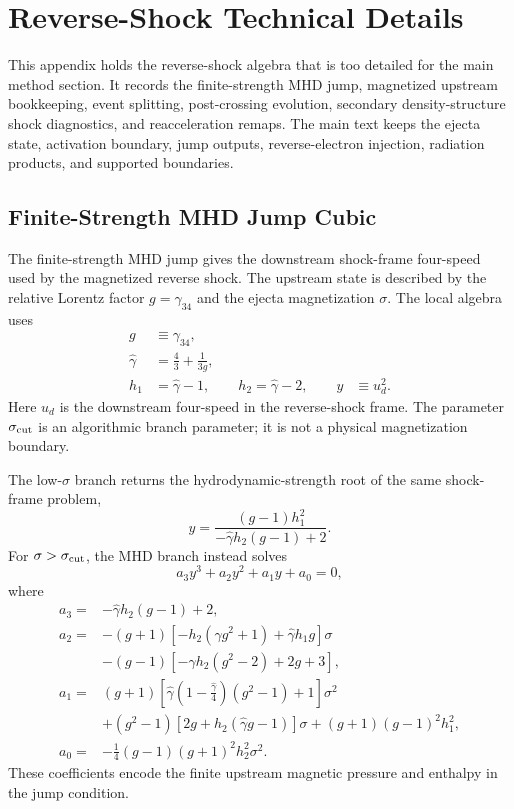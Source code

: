 \documentclass[twocolumn]{aastex702}
\begin{document}
\section{Reverse-Shock Technical Details} \label{app:reverse-shock-technical}

This appendix holds the reverse-shock algebra that is too detailed for the main
method section.  It records the finite-strength MHD jump, magnetized upstream
bookkeeping, event splitting, post-crossing evolution, secondary density-structure
shock diagnostics, and reacceleration remaps.  The main text keeps the ejecta
state, activation boundary, jump outputs, reverse-electron injection, radiation
products, and supported boundaries.

\subsection{Finite-Strength MHD Jump Cubic}

The finite-strength MHD jump gives the downstream shock-frame four-speed used by
the magnetized reverse shock.  The upstream state is described by the relative
Lorentz factor \(g=\gamma_{34}\) and the ejecta magnetization \(\sigma\).  The
local algebra uses
\begin{equation}
\begin{aligned}
g&\equiv\gamma_{34},\\
\hat{\gamma}&=\frac{4}{3}+\frac{1}{3g},\\
h_1&=\hat{\gamma}-1,\qquad
h_2=\hat{\gamma}-2,\qquad
y&\equiv u_d^2 .
\end{aligned}
\end{equation}
Here \(u_d\) is the downstream four-speed in the reverse-shock frame.  The
parameter \(\sigma_{\rm cut}\) is an algorithmic branch parameter; it is not a
physical magnetization boundary.

The low-\(\sigma\) branch returns the hydrodynamic-strength root of the same
shock-frame problem,
\begin{equation}
y=\frac{(g-1)h_1^2}{-\hat{\gamma}h_2(g-1)+2}.
\end{equation}
For \(\sigma>\sigma_{\rm cut}\), the MHD branch instead solves
\begin{equation}
a_3y^3+a_2y^2+a_1y+a_0=0,
\end{equation}
where
\begin{equation}
\begin{aligned}
a_3={}&-\hat{\gamma}h_2(g-1)+2,\\
a_2={}&-(g+1)\left[-h_2(\hat{\gamma}g^2+1)+\hat{\gamma}h_1g\right]\sigma\\
&-(g-1)\left[-\hat{\gamma}h_2(g^2-2)+2g+3\right],\\
a_1={}&(g+1)\left[\hat{\gamma}\left(1-\frac{\hat{\gamma}}{4}\right)
(g^2-1)+1\right]\sigma^2\\
&+(g^2-1)\left[2g+h_2(\hat{\gamma}g-1)\right]\sigma
+(g+1)(g-1)^2h_1^2,\\
a_0={}&-\frac{1}{4}(g-1)(g+1)^2h_2^2\sigma^2 .
\end{aligned}
\end{equation}
These coefficients encode the finite upstream magnetic pressure and enthalpy in
the jump condition.
\end{document}
